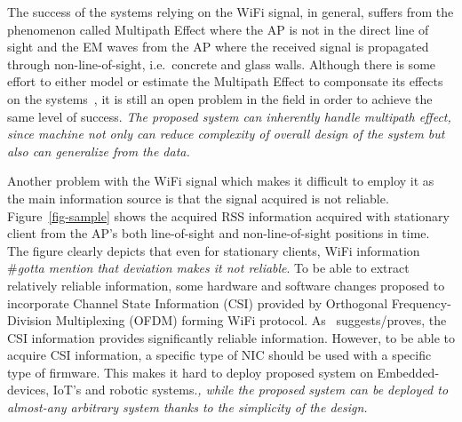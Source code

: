 \documentclass[letterpaper, 10 pt, conference]{ieeeconf}  %
\begin{document}
  The success of the systems relying on the WiFi signal, in general, suffers from the phenomenon called Multipath Effect where the AP is not in the direct line of sight and the EM waves from the AP where the received signal is propagated through non-line-of-sight, i.e.~concrete and glass walls.
  Although there is some effort to either model or estimate the Multipath Effect to componsate its effects on the systems~\cite{cai2015identification}, it is still an open problem in the field in order to achieve the same level of success.
  \textit{The proposed system can inherently handle multipath effect, since machine not only can reduce complexity of overall design of the system but also can generalize from the data.}

  Another problem with the WiFi signal which makes it difficult to employ it as the main information source is that the signal acquired is not reliable.
  Figure~\ref{fig-sample} shows the acquired RSS information acquired with stationary client from the AP's both line-of-sight and non-line-of-sight positions in time.
  The figure clearly depicts that even for stationary clients, WiFi information \#\textit{gotta mention that deviation makes it not reliable}.
  To be able to extract relatively reliable information, some hardware and software changes proposed to incorporate Channel State Information (CSI) provided by Orthogonal Frequency-Division Multiplexing (OFDM) forming WiFi protocol.
  As~\cite{gao2015channel} suggests/proves, the CSI information provides significantly reliable information.
  However, to be able to acquire CSI information, a specific type of NIC should be used with a specific type of firmware.
  This makes it hard to deploy proposed system on Embedded-devices, IoT's and robotic systems.\textit{, while the proposed system can be deployed to almost-any arbitrary system thanks to the simplicity of the design.}
\end{document}
